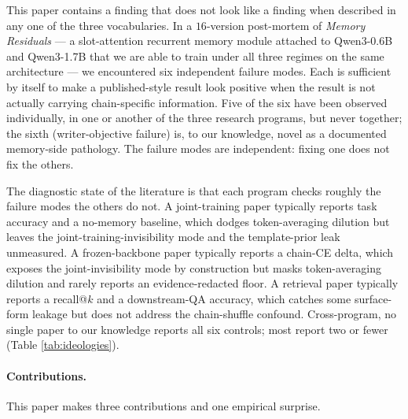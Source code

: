 \documentclass{article}
\begin{document}
This paper contains a finding that does not look like a finding when
described in any one of the three vocabularies.  In a $16$-version
post-mortem of \emph{Memory Residuals} --- a slot-attention recurrent
memory module attached to Qwen3-0.6B and Qwen3-1.7B that we are able
to train under all three regimes on the same architecture --- we
encountered six independent failure modes.  Each is sufficient by
itself to make a published-style result look positive when the result
is not actually carrying chain-specific information.  Five of the six
have been observed individually, in one or another of the three
research programs, but never together; the sixth (writer-objective
failure) is, to our knowledge, novel as a documented memory-side
pathology.  The failure modes are independent: fixing one does not
fix the others.

The diagnostic state of the literature is that each program checks
roughly the failure modes the others do not.  A joint-training paper
typically reports task accuracy and a no-memory baseline, which dodges
token-averaging dilution but leaves the joint-training-invisibility
mode and the template-prior leak unmeasured.  A frozen-backbone paper
typically reports a chain-CE delta, which exposes the
joint-invisibility mode by construction but masks token-averaging
dilution and rarely reports an evidence-redacted floor.  A retrieval
paper typically reports a recall@$k$ and a downstream-QA accuracy,
which catches some surface-form leakage but does not address the
chain-shuffle confound.  Cross-program, no single paper to our
knowledge reports all six controls; most report two or fewer (Table
\ref{tab:ideologies}).

\paragraph{Contributions.}  This paper makes three contributions and
one empirical surprise.
\end{document}
